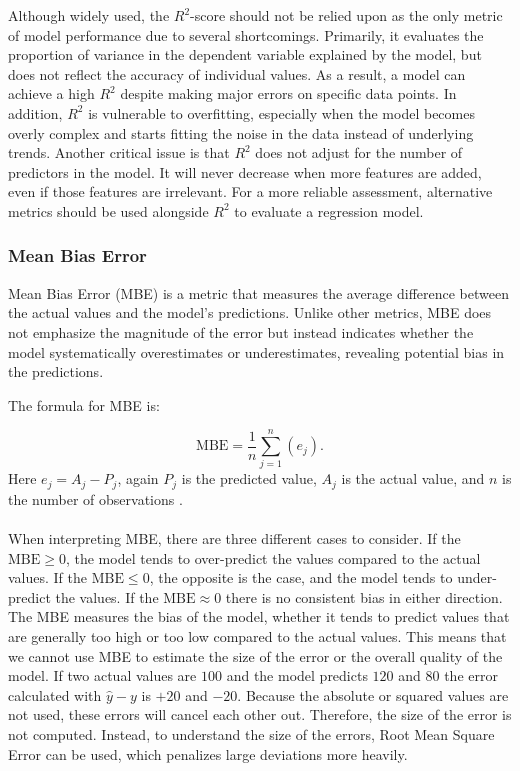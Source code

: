 \noindent Although widely used, the $R^2$-score should not be relied upon as the only metric of model performance due to several shortcomings. Primarily, it evaluates the proportion of variance in the dependent variable explained by the model, but does not reflect the accuracy of individual values. As a result, a model can achieve a high $R^2$ despite making major errors on specific data points. In addition, $R^2$ is vulnerable to overfitting, especially when the model becomes overly complex and starts fitting the noise in the data instead of underlying trends. Another critical issue is that $R^2$ does not adjust for the number of predictors in the model. It will never decrease when more features are added, even if those features are irrelevant. For a more reliable assessment, alternative metrics should be used alongside $R^2$ to evaluate a regression model. 
\newpage

\subsubsection{Mean Bias Error}
Mean Bias Error (MBE) is a metric that measures the average difference between the actual values and the model's predictions. Unlike other metrics, MBE does not emphasize the magnitude of the error but instead indicates whether the model systematically overestimates or underestimates, revealing potential bias in the predictions.

The formula for MBE is:

\begin{equation}
\text{MBE}=\frac{1}{n}\sum_{j=1}^{n}(e_{j}).
\end{equation}
\noindent Here $e_{j}=A_{j}-P_{j}$, again $P_{j}$ is the predicted value, $A_{j}$ is the actual value, and $n$ is the number of observations \cite{metrics}.
\\\\

When interpreting MBE, there are three different cases to consider. If the $\text{MBE}\geq 0$, the model tends to over-predict the values compared to the actual values. If the $\text{MBE}\leq0$, the opposite is the case, and the model tends to under-predict the values. If the $\text{MBE}\approx0$ there is no consistent bias in either direction.
\\

\noindent The MBE measures the bias of the model, whether it tends to predict values that are generally too high or too low compared to the actual values. This means that we cannot use MBE to estimate the size of the error or the overall quality of the model. If two actual values are $100$ and the model predicts $120$ and $80$ the error calculated with $\hat{y}-y$ is $+20$ and $-20$. Because the absolute or squared values are not used, these errors will cancel each other out. Therefore, the size of the error is not computed. Instead, to understand the size of the errors, Root Mean Square Error can be used, which penalizes large deviations more heavily.

